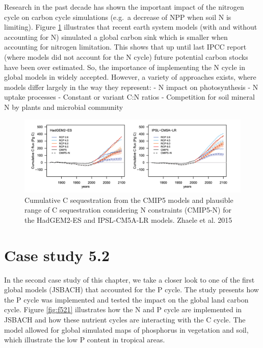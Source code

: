 \documentclass[12pt,oneside]{book}
\begin{document}
Research in the past decade has shown the important impact of the
nitrogen cycle on carbon cycle simulations (e.g.~a decrease of NPP when
soil N is limiting). Figure \ref{fig:f520} illustrates that recent earth
system models (with and without accounting for N) simulated a global
carbon sink which is smaller when accounting for nitrogen limitation.
This shows that up until last IPCC report (where models did not account
for the N cycle) future potential carbon stocks have been over
estimated. So, the importance of implementing the N cycle in global
models in widely accepted. However, a variety of approaches exists,
where models differ largely in the way they represent: - N impact on
photosynthesis - N uptake processes - Constant or variant C:N ratios -
Competition for soil mineral N by plants and microbial community

\begin{figure}

{\centering \includegraphics[width=0.8\linewidth]{figures/chap5/f520_zhaele} 

}

\caption{Cumulative C sequestration from the CMIP5 models and plausible range of C sequestration considering N constraints (CMIP5-N) for the HadGEM2-ES and IPSL-CM5A-LR models. Zhaele et al. 2015}\label{fig:f520}
\end{figure}

\section{Case study 5.2}\label{case-study-5.2}

In the second case study of this chapter, we take a closer look to one
of the first global models (JSBACH) that accounted for the P cycle. The
study presents how the P cycle was implemented and tested the impact on
the global land carbon cycle. Figure \ref{fig:f521} illustrates how the
N and P cycle are implemented in JSBACH and how these nutrient cycles
are interacting with the C cycle. The model allowed for global simulated
maps of phosphorus in vegetation and soil, which illustrate the low P
content in tropical areas.
\end{document}
